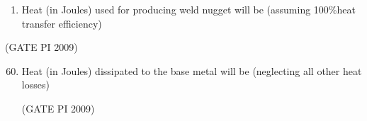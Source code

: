 \documentclass[journal,12pt,onecolumn]{IEEEtran}
\theoremstyle{remark}
\begin{document}
\begin{enumerate}[label=Q.\arabic*), leftmargin=*, resume]

\item Heat (in Joules) used for producing weld nugget will be (assuming 100\%heat transfer efficiency)
\begin{enumerate}
\end{enumerate}
\end{enumerate}
\hfill (GATE PI 2009)
\begin{enumerate}[label=Q.\arabic*)]
   \setcounter{enumi}{59}
\item Heat (in Joules) dissipated to the base metal will be (neglecting all other heat losses)
\begin{enumerate}
\end{enumerate}
\hfill (GATE PI 2009)

\end{enumerate}
\end{document}
